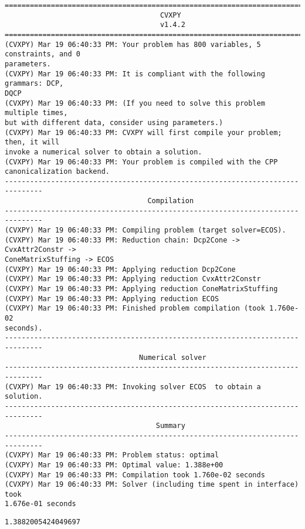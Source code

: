 \documentclass[11pt]{article}
\makeatletter
\newcommand{\boxspacing}{\kern\kvtcb@left@rule\kern\kvtcb@boxsep}
\newcommand{\prompt}[4]{
        {\ttfamily\llap{{\color{#2}[#3]:\hspace{3pt}#4}}\vspace{-\baselineskip}}
    }
\makeatother
\begin{document}
    \begin{Verbatim}[commandchars=\\\{\}]
===============================================================================
                                     CVXPY
                                     v1.4.2
===============================================================================
(CVXPY) Mar 19 06:40:33 PM: Your problem has 800 variables, 5 constraints, and 0
parameters.
(CVXPY) Mar 19 06:40:33 PM: It is compliant with the following grammars: DCP,
DQCP
(CVXPY) Mar 19 06:40:33 PM: (If you need to solve this problem multiple times,
but with different data, consider using parameters.)
(CVXPY) Mar 19 06:40:33 PM: CVXPY will first compile your problem; then, it will
invoke a numerical solver to obtain a solution.
(CVXPY) Mar 19 06:40:33 PM: Your problem is compiled with the CPP
canonicalization backend.
-------------------------------------------------------------------------------
                                  Compilation
-------------------------------------------------------------------------------
(CVXPY) Mar 19 06:40:33 PM: Compiling problem (target solver=ECOS).
(CVXPY) Mar 19 06:40:33 PM: Reduction chain: Dcp2Cone -> CvxAttr2Constr ->
ConeMatrixStuffing -> ECOS
(CVXPY) Mar 19 06:40:33 PM: Applying reduction Dcp2Cone
(CVXPY) Mar 19 06:40:33 PM: Applying reduction CvxAttr2Constr
(CVXPY) Mar 19 06:40:33 PM: Applying reduction ConeMatrixStuffing
(CVXPY) Mar 19 06:40:33 PM: Applying reduction ECOS
(CVXPY) Mar 19 06:40:33 PM: Finished problem compilation (took 1.760e-02
seconds).
-------------------------------------------------------------------------------
                                Numerical solver
-------------------------------------------------------------------------------
(CVXPY) Mar 19 06:40:33 PM: Invoking solver ECOS  to obtain a solution.
-------------------------------------------------------------------------------
                                    Summary
-------------------------------------------------------------------------------
(CVXPY) Mar 19 06:40:33 PM: Problem status: optimal
(CVXPY) Mar 19 06:40:33 PM: Optimal value: 1.388e+00
(CVXPY) Mar 19 06:40:33 PM: Compilation took 1.760e-02 seconds
(CVXPY) Mar 19 06:40:33 PM: Solver (including time spent in interface) took
1.676e-01 seconds
    \end{Verbatim}

            \begin{tcolorbox}[breakable, size=fbox, boxrule=.5pt, pad at break*=1mm, opacityfill=0]
\prompt{Out}{outcolor}{4}{\boxspacing}
\begin{Verbatim}[commandchars=\\\{\}]
1.3882005424049697
\end{Verbatim}
\end{tcolorbox}
        
\end{document}
